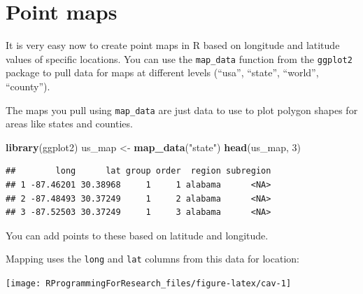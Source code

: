 \documentclass[]{book}
\makeatletter
\newenvironment{Shaded}{\begin{snugshade}}{\end{snugshade}}
\newcommand{\KeywordTok}[1]{\textcolor[rgb]{0.13,0.29,0.53}{\textbf{#1}}}
\newcommand{\DataTypeTok}[1]{\textcolor[rgb]{0.13,0.29,0.53}{#1}}
\newcommand{\DecValTok}[1]{\textcolor[rgb]{0.00,0.00,0.81}{#1}}
\newcommand{\StringTok}[1]{\textcolor[rgb]{0.31,0.60,0.02}{#1}}
\newcommand{\OperatorTok}[1]{\textcolor[rgb]{0.81,0.36,0.00}{\textbf{#1}}}
\newcommand{\NormalTok}[1]{#1}
\newenvironment{kframe}{%
\medskip{}
\setlength{\fboxsep}{.8em}
 \def\at@end@of@kframe{}%
 \ifinner\ifhmode%
  \def\at@end@of@kframe{\end{minipage}}%
  \begin{minipage}{\columnwidth}%
 \fi\fi%
 \def\FrameCommand##1{\hskip\@totalleftmargin \hskip-\fboxsep
 \colorbox{shadecolor}{##1}\hskip-\fboxsep
     \hskip-\linewidth \hskip-\@totalleftmargin \hskip\columnwidth}%
 \MakeFramed {\advance\hsize-\width
   \@totalleftmargin\z@ \linewidth\hsize
   \@setminipage}}%
 {\par\unskip\endMakeFramed%
 \at@end@of@kframe}
\renewenvironment{Shaded}{\begin{kframe}}{\end{kframe}}
\theoremstyle{definition}
\theoremstyle{definition}
\theoremstyle{definition}
\theoremstyle{remark}
\makeatother
\begin{document}
\section{Point maps}\label{point-maps}

It is very easy now to create point maps in R based on longitude and
latitude values of specific locations. You can use the
\texttt{map\_data} function from the \texttt{ggplot2} package to pull
data for maps at different levels (``usa'', ``state'', ``world'',
``county'').

The maps you pull using \texttt{map\_data} are just data to use to plot
polygon shapes for areas like states and counties.

\begin{Shaded}
\begin{Highlighting}[]
\KeywordTok{library}\NormalTok{(ggplot2)}
\NormalTok{us_map <-}\StringTok{ }\KeywordTok{map_data}\NormalTok{(}\StringTok{"state"}\NormalTok{)}
\KeywordTok{head}\NormalTok{(us_map, }\DecValTok{3}\NormalTok{)}
\end{Highlighting}
\end{Shaded}

\begin{verbatim}
##        long      lat group order  region subregion
## 1 -87.46201 30.38968     1     1 alabama      <NA>
## 2 -87.48493 30.37249     1     2 alabama      <NA>
## 3 -87.52503 30.37249     1     3 alabama      <NA>
\end{verbatim}

You can add points to these based on latitude and longitude.

Mapping uses the \texttt{long} and \texttt{lat} columns from this data
for location:

\begin{Shaded}
\end{Shaded}

\begin{center}\texttt{[image: RProgrammingForResearch\_files/figure-latex/cav-1]} \end{center}
\end{document}
